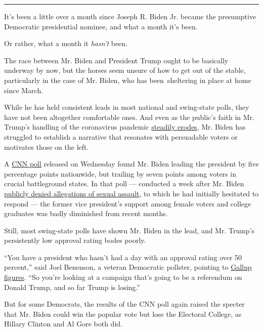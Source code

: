 \begin{center}\rule{0.5\linewidth}{\linethickness}\end{center}

It's been a little over a month since Joseph R. Biden Jr. became the
presumptive Democratic presidential nominee, and what a month it's been.

Or rather, what a month it \emph{hasn't} been.

The race between Mr. Biden and President Trump ought to be basically
underway by now, but the horses seem unsure of how to get out of the
stable, particularly in the case of Mr. Biden, who has been~sheltering
in place at home since March.

While he has held consistent leads in most national and swing-state
polls, they have not been altogether comfortable ones. And even as the
public's faith in Mr. Trump's handling of the coronavirus pandemic
\href{https://www.realclearpolitics.com/epolls/other/public_approval_of_president_trumps_handling_of_the_coronavirus-7088.html}{steadily
erodes}, Mr. Biden has struggled to establish a narrative that resonates
with persuadable voters or motivates those on the left.

A
\href{https://www.cnn.com/2020/05/13/politics/cnn-poll-2020/index.html}{CNN
poll} released on Wednesday found Mr. Biden leading the president by
five percentage points nationwide, but trailing by seven points among
voters in crucial battleground states. In that poll --- conducted a week
after Mr. Biden
\href{https://www.nytimes3xbfgragh.onion/2020/05/01/us/politics/joe-biden-tara-reade-morning-joe.html}{publicly
denied allegations of sexual assault}, to which he had initially
hesitated to respond --- the former vice president's support among
female voters and college graduates was badly diminished from recent
months.

Still, most swing-state polls have shown Mr. Biden in the lead, and Mr.
Trump's persistently low approval rating bodes poorly.

``You have a president who hasn't had a day with an approval rating over
50 percent,'' said Joel Benenson, a veteran Democratic pollster,
pointing to
\href{https://news.gallup.com/poll/203207/trump-job-approval-weekly.aspx}{Gallup
figures}. ``So you're looking at a campaign that's going to be a
referendum on Donald Trump, and so far Trump is losing.''

But for some Democrats, the results of the CNN poll again raised the
specter that Mr. Biden could win the popular vote but lose the Electoral
College, as Hillary Clinton and Al Gore both did.

